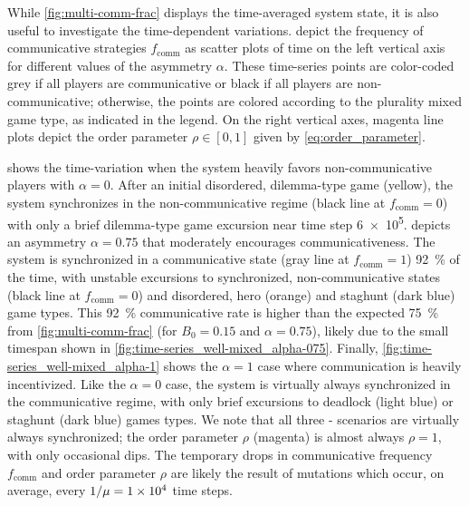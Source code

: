 \documentclass[pdflatex,twocolumn,sn-nature,super]{sn-jnl}
\begin{document}
While \cref{fig:multi-comm-frac} displays
the time-averaged system state,
it is also useful to investigate the time-dependent variations.
depict the frequency
of communicative strategies $f_{\text{comm}}$
as scatter plots of time on the left vertical axis
for different values of the asymmetry $\alpha$.
These time-series points are color-coded
grey if all players are communicative or
black if all players are non-communicative;
otherwise, the points are colored according
to the plurality mixed game type, as indicated in the legend.
On the right vertical axes,
magenta line plots depict the order parameter
$\rho \in [0,1]$
given by \cref{eq:order_parameter}.

 shows the time-variation
when the system heavily favors non-communicative players
with $\alpha = 0$.
After an initial disordered, dilemma-type game (yellow),
the system synchronizes in the non-communicative regime
(black line at $f_{\text{comm}} = 0$)
with only a brief dilemma-type game excursion near time step \num{6e5}.
 depicts an asymmetry $\alpha = 0.75$
that moderately encourages communicativeness.
The system is synchronized in a communicative state
(gray line at $f_{\text{comm}} = 1$) \SI{92}{\percent} of the time,
with unstable excursions to synchronized, non-communicative states
(black line at $f_{\text{comm}} = 0$)
and disordered, hero (orange) and staghunt (dark blue) game types.
This \SI{92}{\percent} communicative rate is higher than the expected \SI{75}{\percent}
from \cref{fig:multi-comm-frac} (for $B_0 = 0.15$ and $\alpha = 0.75$),
likely due to the small timespan shown in
\cref{fig:time-series_well-mixed_alpha-075}.
Finally, \cref{fig:time-series_well-mixed_alpha-1} shows the
$\alpha = 1$ case where communication is heavily incentivized.
Like the  $\alpha = 0$ case,
the system is virtually always synchronized in the communicative regime,
with only brief excursions to deadlock (light blue)
or staghunt (dark blue) games types.
We note that all three
-
scenarios are virtually always synchronized;
the order parameter $\rho$ (magenta) is almost always $\rho = 1$,
with only occasional dips.
The temporary drops in communicative frequency $f_{\text{comm}}$
and order parameter $\rho$ are likely the result of mutations
which occur, on average, every $1/\mu = \num{1E4}$ time steps.
\end{document}
